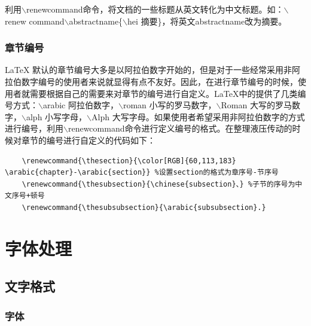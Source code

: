 \documentclass[12pt]{book}
\begin{document}
    
利用$\backslash$renewcommand命令，将文档的一些标题从英文转化为中文标题。如：$\backslash$renew command$\backslash$abstractname\{$\backslash$hei 摘要\}，将英文abstractname改为摘要。
    
%

\subsection{章节编号}

\LaTeX{} 默认的章节编号大多是以阿拉伯数字开始的，但是对于一些经常采用非阿拉伯数字编号的使用者来说就显得有点不友好。因此，在进行章节编号的时候，使用者就需要根据自己的需要来对章节的编号进行自定义。\LaTeX{}中的提供了几类编号方式：$\backslash$arabic 阿拉伯数字，$\backslash$roman 小写的罗马数字，$\backslash$Roman 大写的罗马数字，$\backslash$alph 小写字母，$\backslash$Alph 大写字母。如果使用者希望采用非阿拉伯数字的方式进行编号，利用$\backslash$renewcommand命令进行定义编号的格式。在整理液压传动的时候对章节的编号进行自定义的代码如下：

\begin{verbatim}
    \renewcommand{\thesection}{\color[RGB]{60,113,183} \arabic{chapter}-\arabic{section}} %设置section的格式为章序号-节序号
    \renewcommand{\thesubsection}{\chinese{subsection}、} %子节的序号为中文序号+顿号
    \renewcommand{\thesubsubsection}{\arabic{subsubsection}.} 
\end{verbatim}

\chapter{字体处理}



\section{文字格式}

\subsection{字体}
\end{document}
